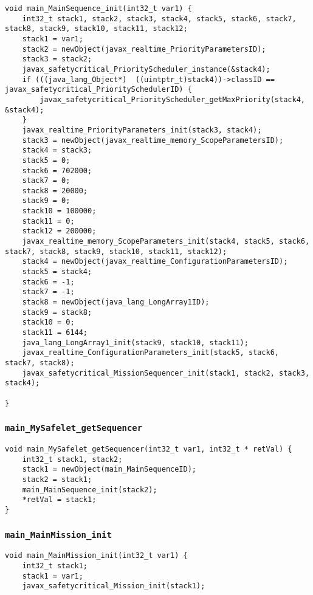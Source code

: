 \begin{landscape}
\begin{multicols}{2}
\begin{lstlisting}[firstnumber=1297]
void main_MainSequence_init(int32_t var1) {
	int32_t stack1, stack2, stack3, stack4, stack5, stack6, stack7, stack8, stack9, stack10, stack11, stack12;
	stack1 = var1;
	stack2 = newObject(javax_realtime_PriorityParametersID);
	stack3 = stack2;
	javax_safetycritical_PriorityScheduler_instance(&stack4);
	if (((java_lang_Object*)  ((uintptr_t)stack4))->classID == javax_safetycritical_PrioritySchedulerID) {
		javax_safetycritical_PriorityScheduler_getMaxPriority(stack4, &stack4);
	}
	javax_realtime_PriorityParameters_init(stack3, stack4);
	stack3 = newObject(javax_realtime_memory_ScopeParametersID);
	stack4 = stack3;
	stack5 = 0;
	stack6 = 702000;
	stack7 = 0;
	stack8 = 20000;
	stack9 = 0;
	stack10 = 100000;
	stack11 = 0;
	stack12 = 200000;
	javax_realtime_memory_ScopeParameters_init(stack4, stack5, stack6, stack7, stack8, stack9, stack10, stack11, stack12);
	stack4 = newObject(javax_realtime_ConfigurationParametersID);
	stack5 = stack4;
	stack6 = -1;
	stack7 = -1;
	stack8 = newObject(java_lang_LongArray1ID);
	stack9 = stack8;
	stack10 = 0;
	stack11 = 6144;
	java_lang_LongArray1_init(stack9, stack10, stack11);
	javax_realtime_ConfigurationParameters_init(stack5, stack6, stack7, stack8);
	javax_safetycritical_MissionSequencer_init(stack1, stack2, stack3, stack4);

}
\end{lstlisting}

\subsubsection{\texttt{main\_MySafelet\_getSequencer}}

\begin{lstlisting}[firstnumber=1551]
void main_MySafelet_getSequencer(int32_t var1, int32_t * retVal) {
	int32_t stack1, stack2;
	stack1 = newObject(main_MainSequenceID);
	stack2 = stack1;
	main_MainSequence_init(stack2);
	*retVal = stack1;
}
\end{lstlisting}

\subsubsection{\texttt{main\_MainMission\_init}}

\begin{lstlisting}[firstnumber=1666]
void main_MainMission_init(int32_t var1) {
	int32_t stack1;
	stack1 = var1;
	javax_safetycritical_Mission_init(stack1);


\end{lstlisting}
\end{multicols}
\end{landscape}

